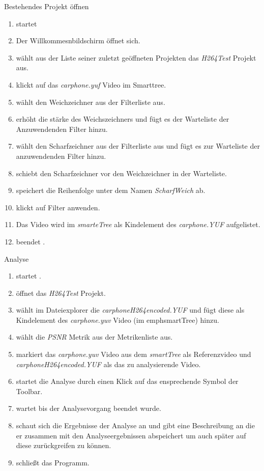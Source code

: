  Bestehendes Projekt öffnen\\ %
\begin{enumerate}
\item \dAU startet \projektTitel
\item Der Willkommesnbildschirm öffnet sich.
\item \dAU wählt aus der Liste seiner zuletzt geöffneten Projekten das \emph{H264Test} Projekt aus.
\item \dAU klickt auf das \emph{carphone.yuf} Video im Smarttree.
\item \dAU wählt den Weichzeichner aus der Filterliste aus.
\item \dAU erhöht die stärke des Weichszeichners und fügt es der Warteliste der Anzuwendenden Filter hinzu.
\item \dAU wählt den Scharfzeichner aus der Filterliste aus und fügt es zur Warteliste der anzuwendenden Filter hinzu. 
\item \dAU schiebt den Scharfzeichner vor den Weichzeichner in der Warteliste.
\item \dAU speichert die Reihenfolge unter dem Namen \emph{ScharfWeich} ab.
\item \dAU klickt auf Filter anwenden.
\item Das Video wird im \emph{smarteTree} als Kindelement des \emph{carphone.YUF} aufgelistet.
\item  \dAU beendet \projektTitel.
\end{enumerate}

 Analyse
\begin{enumerate}
\item \dAU startet \projektTitel.
\item öffnet das \emph{H264Test} Projekt.
\item \dAU wählt im Dateiexplorer die \emph{carphoneH264encoded.YUF} und fügt diese als Kindelement des \emph{carphone.yuv} Video (im emph{smartTree}) hinzu.
\item \dAU wählt die \emph{PSNR} Metrik aus der Metrikenliste aus.
\item \dAU markiert das \emph{carphone.yuv} Video aus dem \emph{smartTree} als Referenzvideo und \emph{carphoneH264encoded.YUF} als das zu analysierende Video.
\item \dAU startet die Analyse durch einen Klick auf das ensprechende Symbol der Toolbar.
\item \dAU wartet bis der Analysevorgang beendet wurde.
\item \dAU schaut sich die Ergebnisse der Analyse an und gibt eine Beschreibung an die er zusammen mit den Analyseergebnissen abspeichert um auch später auf diese zurückgreifen zu können.
\item \dAU schließt das Programm.
\end{enumerate}
